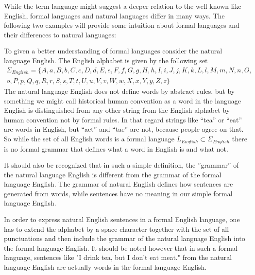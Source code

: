 While the term language might suggest a deeper relation to the well known  like English, formal languages and natural languages differ in many ways. The following two examples will provide some intuition about formal languages and their differences to natural languages: 
\begin{example} To given a better understanding of formal languages consider the natural language English. The English alphabet is given by the following set
\begin{multline*}
\Sigma_{English} = \{A, a, B, b, C, c, D, d, E, e, F, f, G, g, H, h, I, i, J, j, K, k, L, l, M, m, N, n, O,\\ o, P, p, Q, q, R, r, S, s, T, t, U, u, V, v, W, w, X, x, Y, y, Z, z\}
\end{multline*}
The natural language English does not define words by abstract rules, but by something we might call historical human convention as a word in the language English is distinguished from any other string from the English alphabet by human convention not by formal rules. In that regard strings like ``tea'' or ``eat'' are words in English, but ``aet'' and ``tae'' are not, because people agree on that. So while the set of all English words is a formal language $L_{English}\subset \Sigma_{English}$ there is no formal grammar that defines what a word in English is and what not. 

It should also be recognized that in such a simple definition, the ''grammar'' of the natural language English is different from the grammar of the formal language English. The grammar of natural English defines how sentences are generated from words, while sentences have no meaning in our simple formal language English. 

In order to express natural English sentences in a formal English language, one has to extend the alphabet by a space character together with the set of all punctuations and then include the grammar of the natural language English into the formal language English. It should be noted however that in such a formal language, sentences like "I drink tea, but I don't eat meat." from the natural language English are actually words in the formal language English.
\end{example}

